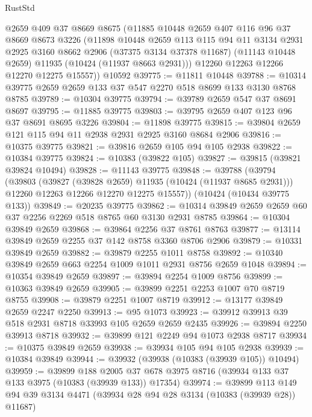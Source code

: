 \begin{lexlean}{RustStd}
\begin{coremodule}
      @2659
      @409
      @37
      @8669
      @8675
      (@11885
        @10448
        @2659
        @407
        @116
        @96
        @37
        @8669
        @8673
        @3226
        (@11898
          @10448
          @2659
          @113
          @115
          @94
          @11
          @3134
          @2931
          @2925
          @3160
          @8662
          @2906
          (@37375 @3134 @37378 @11687)
          (@11143 @10448 @2659)
          @11935
          (@10424 (@11937 @8663 @2931)))
        @12260
        @12263
        @12266
        @12270
        @12275
        @15557))
    @10592
@39775 := @11811 @10448
@39788 := @10314 @39775 @2659 @2659 @133 @37 @547 @2270 @518 @8699 @133 @3130 @8768 @8785
@39789 := @10304 @39775
@39794 := @39789 @2659 @547 @37 @8691 @8697
@39795 := @11885 @39775
@39803 := @39795 @2659 @407 @123 @96 @37 @8691 @8695 @3226
@39804 := @11898 @39775
@39815 := @39804 @2659 @121 @115 @94 @11 @2938 @2931 @2925 @3160 @8684 @2906
@39816 := @10375 @39775
@39821 := @39816 @2659 @105 @94 @105 @2938
@39822 := @10384 @39775
@39824 := @10383 (@39822 @105)
@39827 := @39815 (@39821 @39824 @10494)
@39828 := @11143 @39775
@39848 := @39788
    (@39794
      (@39803
        (@39827 (@39828 @2659) @11935 (@10424 (@11937 @8685 @2931)))
        @12260
        @12263
        @12266
        @12270
        @12275
        @15557))
    (@10424 (@10434 @39775 @133))
@39849 := @20235 @39775
@39862 := @10314 @39849 @2659 @2659 @60 @37 @2256 @2269 @518 @8765 @60 @3130 @2931 @8785
@39864 := @10304 @39849 @2659
@39868 := @39864 @2256 @37 @8761 @8763
@39877 := @13114 @39849 @2659 @2255 @37 @142 @8758 @3360 @8706 @2906
@39879 := @10331 @39849 @2659
@39882 := @39879 @2255 @1011 @8758
@39892 := @10340 @39849 @2659 @663 @2254 @1009 @1011 @2931 @8756 @2659 @1048
@39894 := @10354 @39849 @2659
@39897 := @39894 @2254 @1009 @8756
@39899 := @10363 @39849 @2659
@39905 := @39899 @2251 @2253 @1007 @70 @8719 @8755
@39908 := @39879 @2251 @1007 @8719
@39912 := @13177 @39849 @2659 @2247 @2250
@39913 := @95 @1073
@39923 := @39912 @39913 @39 @518 @2931 @8718 @33993 @105 @2659 @2659 @2435
@39926 := @39894 @2250 @39913 @8718
@39932 := @39899 @121 @2249 @94 @1073 @2938 @8717
@39934 := @10375 @39849 @2659
@39938 := @39934 @105 @94 @105 @2938
@39939 := @10384 @39849
@39944 := @39932 (@39938 (@10383 (@39939 @105)) @10494)
@39959 := @39899
    @188
    @2005
    @37
    @678
    @3975
    @8716
    (@39934 @133 @37 @133 @3975 (@10383 (@39939 @133)) @17354)
@39974 := @39899
    @113
    @149
    @94
    @39
    @3134
    @4471
    (@39934 @28 @94 @28 @3134 (@10383 (@39939 @28)) @11687)

\end{coremodule}
\end{lexlean}
